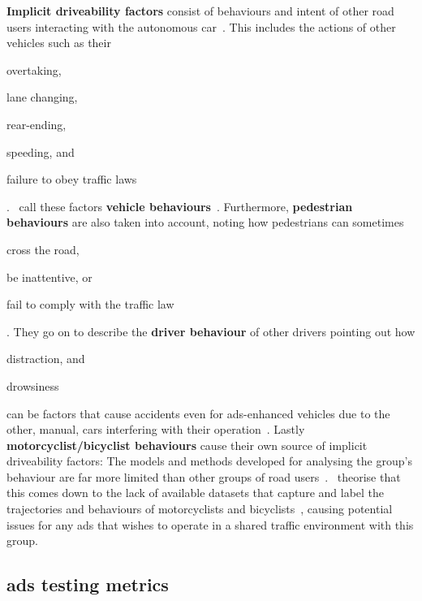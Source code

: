 \textbf{Implicit driveability factors} consist of behaviours and intent of other road users
interacting with the autonomous car~\cite[3138]{safeToDrive}. This includes the actions of other
vehicles such as their \begin{inparaenum}
    \item overtaking,
    \item lane changing,
    \item rear-ending,
    \item speeding, and
    \item failure to obey traffic laws \end{inparaenum}.~\citeauthor{safeToDrive} call these factors
\textbf{vehicle behaviours}~\cite[3138]{safeToDrive}. Furthermore, \textbf{pedestrian behaviours}
are also taken into account, noting how pedestrians can sometimes
\begin{inparaenum}\setcounter{enumi}{5}
    \item cross the road,
    \item be inattentive, or
    \item fail to comply with the traffic law \end{inparaenum}\cite[3138]{safeToDrive}. They go on
to describe the \textbf{driver behaviour} of other drivers pointing out how
\begin{inparaenum}\setcounter{enumi}{8}
    \item distraction, and
    \item drowsiness \end{inparaenum} can be factors that cause accidents even for
\acrshort{ads}-enhanced vehicles due to the other, manual, cars
interfering with their operation~\cite[3138-3139]{safeToDrive}. Lastly
\textbf{motorcyclist/bicyclist behaviours} cause their own source of implicit driveability factors:
The models and methods developed for analysing the group's behaviour are far more limited than other
groups of road users~\cite[3139]{safeToDrive}.~\citeauthor{safeToDrive} theorise that this comes
down to the lack of available datasets that capture and label the trajectories and behaviours
of motorcyclists and bicyclists~\cite[3139]{safeToDrive}, causing potential issues for any
\acrshort{ads} that wishes to operate in a shared traffic environment with this group.

\subsection{\acrlong{ads} testing metrics}\label{sec:adsMetrics}

